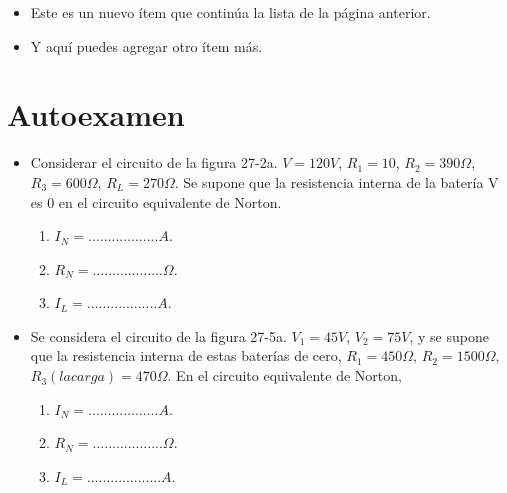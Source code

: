 
\begin{itemize}[series=resumenlist, resume]
    \item Este es un nuevo ítem que continúa la lista de la página anterior.
    \item Y aquí puedes agregar otro ítem más.
\end{itemize}

\section{Autoexamen}
\begin{itemize}
    \item Considerar el circuito de la figura 27-2a. $V=120 V$, $R_1=10$, 
    $R_2=390 \Omega$, $R_3=600 \Omega$, $R_L=270 \Omega$. Se supone que 
    la resistencia interna de la batería V es 0 en el circuito 
    equivalente de Norton.
    \begin{enumerate}
        \item $I_N = ..................A$.
        \item $R_N = .................. \Omega$.
        \item $I_L = ..................A$.
    \end{enumerate}
    \item Se considera el circuito de la figura 27-5a. $V_1=45 V$, $V_2=75 V$, y 
    se supone que la resistencia interna de estas baterías de cero, 
    $R_1=450 \Omega$, $R_2=1500 \Omega$, $R_3 (la carga) =470 \Omega$.
    En el circuito equivalente de Norton,
    \begin{enumerate}
        \item $I_N = ..................A$.
        \item $R_N = .................. \Omega$.
        \item $I_L = ...................A$.
    \end{enumerate}
\end{itemize}

